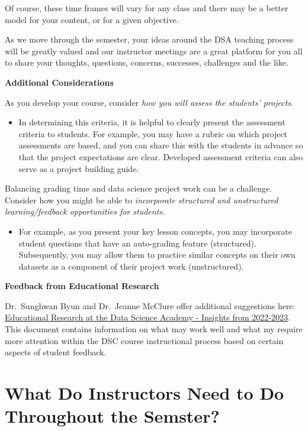 \documentclass[
]{book}
\providecommand{\tightlist}{%
  \setlength{\itemsep}{0pt}\setlength{\parskip}{0pt}}
\begin{document}
Of course, these time frames will vary for any class and there may be a better model for your content, or for a given objective.

As we move through the semester, your ideas around the DSA teaching process will be greatly valued and our instructor meetings are a great platform for you all to share your thoughts, questions, concerns, successes, challenges and the like.

\textbf{Additional Considerations}

As you develop your course, consider \emph{how you will assess the students' projects}.

\begin{itemize}
\tightlist
\item
  In determining this criteria, it is helpful to clearly present the assessment criteria to students. For example, you may have a rubric on which project assessments are based, and you can share this with the students in advance so that the project expectations are clear. Developed assessment criteria can also serve as a project building guide.
\end{itemize}

Balancing grading time and data science project work can be a challenge. Consider how you might be able to \emph{incorporate structured and unstructured learning/feedback opportunities for students}.

\begin{itemize}
\tightlist
\item
  For example, as you present your key lesson concepts, you may incorporate student questions that have an auto-grading feature (structured). Subsequently, you may allow them to practice similar concepts on their own datasets as a component of their project work (unstructured).
\end{itemize}

\textbf{Feedback from Educational Research}

Dr.~Sunghwan Byun and Dr.~Jeanne McClure offer additional suggestions here: \href{https://docs.google.com/document/d/1jRILSc0DsFm2moet9Ep8bF1suEOfHfnLzfJ2t4tIfjA/edit?usp=sharing}{Educational Research at the Data Science Academy - Insights from 2022-2023}. This document contains information on what may work well and what my require more attention within the DSC course instructional process based on certain aspects of student feedback.

\chapter{What Do Instructors Need to Do Throughout the Semster?}\label{what-do-instructors-need-to-do-throughout-the-semster}
\end{document}
